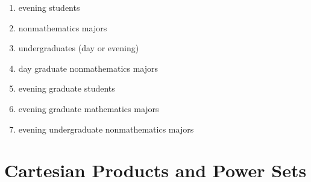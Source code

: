 \documentclass[10pt,]{book}
\theoremstyle{plain}
\theoremstyle{definition}
\theoremstyle{definition}
\theoremstyle{definition}
\theoremstyle{definition}
\begin{document}
\begin{exercisegroup}
\par
\leavevmode%
\begin{multicols}{2}
\begin{enumerate}[label=\alph*]
\item\hypertarget{li-127}{}  evening students %
\item\hypertarget{li-128}{}  nonmathematics majors %
\item\hypertarget{li-129}{}  undergraduates (day or evening) %
\item\hypertarget{li-130}{}  day graduate nonmathematics majors %
\item\hypertarget{li-131}{}  evening graduate students %
\item\hypertarget{li-132}{}  evening graduate mathematics majors %
\item\hypertarget{li-133}{}  evening undergraduate nonmathematics majors %
\end{enumerate}
\end{multicols}
%
\par\smallskip
\end{exercisegroup}
\par\smallskip\noindent
\typeout{************************************************}
\typeout{************************************************}
\section[Cartesian Products and Power Sets]{Cartesian Products and Power Sets}\label{Cartesian_Products_and_Power_Sets}
\typeout{************************************************}
\typeout{************************************************}
\end{document}

